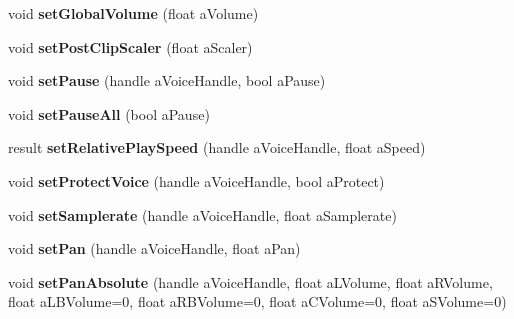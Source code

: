 \begin{DoxyCompactItemize}
\item 
\mbox{\label{class_so_loud_1_1_soloud_a685ac512e992520cd939460308ef90f9}} 
void {\bfseries set\+Global\+Volume} (float a\+Volume)
\item 
\mbox{\label{class_so_loud_1_1_soloud_a66ddc86d64a1a1afe0e3ee729f03137e}} 
void {\bfseries set\+Post\+Clip\+Scaler} (float a\+Scaler)
\item 
\mbox{\label{class_so_loud_1_1_soloud_a950ec356b2fabceaa35b8a7eb03cf4d3}} 
void {\bfseries set\+Pause} (handle a\+Voice\+Handle, bool a\+Pause)
\item 
\mbox{\label{class_so_loud_1_1_soloud_a6e88cde01e539557fcfe3afbe9d9ef09}} 
void {\bfseries set\+Pause\+All} (bool a\+Pause)
\item 
\mbox{\label{class_so_loud_1_1_soloud_a45ac9d70d52266fb60651b0f4642d7cb}} 
result {\bfseries set\+Relative\+Play\+Speed} (handle a\+Voice\+Handle, float a\+Speed)
\item 
\mbox{\label{class_so_loud_1_1_soloud_affa0f7f149a859bca79deb55b0c66e5c}} 
void {\bfseries set\+Protect\+Voice} (handle a\+Voice\+Handle, bool a\+Protect)
\item 
\mbox{\label{class_so_loud_1_1_soloud_a1a6e400c35e543ed70c7be3ae808b4da}} 
void {\bfseries set\+Samplerate} (handle a\+Voice\+Handle, float a\+Samplerate)
\item 
\mbox{\label{class_so_loud_1_1_soloud_a2c78e611871ef145b976a5c717c8d865}} 
void {\bfseries set\+Pan} (handle a\+Voice\+Handle, float a\+Pan)
\item 
\mbox{\label{class_so_loud_1_1_soloud_a31b07a9d4c8ff56adaf397586a7483a8}} 
void {\bfseries set\+Pan\+Absolute} (handle a\+Voice\+Handle, float a\+L\+Volume, float a\+R\+Volume, float a\+L\+B\+Volume=0, float a\+R\+B\+Volume=0, float a\+C\+Volume=0, float a\+S\+Volume=0)
\item 
\mbox{\label{class_so_loud_1_1_soloud_a1e6f5c43489244f0d6495845a310508c}} 

\end{DoxyCompactItemize}
